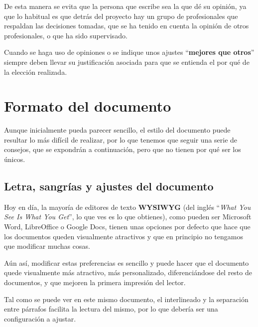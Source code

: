 

De esta manera se evita que la persona que escribe sea la que dé su opinión, ya que lo habitual es que detrás del proyecto hay un grupo de profesionales que respaldan las decisiones tomadas, que se ha tenido en cuenta la opinión de otros profesionales, o que ha sido supervisado.

Cuando se haga uso de opiniones o se indique unos ajustes “\textbf{mejores que otros}” siempre deben llevar su justificación asociada para que se entienda el por qué de la elección realizada.



\chapter{Formato del documento}
Aunque inicialmente pueda parecer sencillo, el estilo del documento puede resultar lo más difícil de realizar, por lo que tenemos que seguir una serie de consejos, que se expondrán a continuación, pero que no tienen por qué ser los únicos.


\section{Letra, sangrías y ajustes del documento}
Hoy en día, la mayoría de editores de texto \textbf{WYSIWYG} (del inglés “\textit{What You See Is What You Get}”, lo que ves es lo que obtienes), como pueden ser Microsoft Word, LibreOffice o Google Docs, tienen unas opciones por defecto que hace que los documentos queden visualmente atractivos y que en principio no tengamos que modificar muchas cosas.

Aún así, modificar estas preferencias es sencillo y puede hacer que el documento quede visualmente más atractivo, más personalizado, diferenciándose del resto de documentos, y que mejoren la primera impresión del lector.



Tal como se puede ver en este mismo documento, el interlineado y la separación entre párrafos facilita la lectura del mismo, por lo que debería ser una configuración a ajustar.

